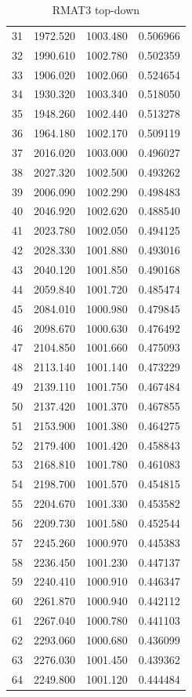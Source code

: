 \documentclass[10pt,twocolumn,letterpaper]{article}
\begin{document}
\begin{table}[h]
\begin{tabular}{@{}c|ccc@{}}
31 & 1972.520 & 1003.480 & 0.506966 \\
32 & 1990.610 & 1002.780 & 0.502359 \\
33 & 1906.020 & 1002.060 & 0.524654 \\
34 & 1930.320 & 1003.340 & 0.518050 \\
35 & 1948.260 & 1002.440 & 0.513278 \\
36 & 1964.180 & 1002.170 & 0.509119 \\
37 & 2016.020 & 1003.000 & 0.496027 \\
38 & 2027.320 & 1002.500 & 0.493262 \\
39 & 2006.090 & 1002.290 & 0.498483 \\
40 & 2046.920 & 1002.620 & 0.488540 \\
41 & 2023.780 & 1002.050 & 0.494125 \\
42 & 2028.330 & 1001.880 & 0.493016 \\
43 & 2040.120 & 1001.850 & 0.490168 \\
44 & 2059.840 & 1001.720 & 0.485474 \\
45 & 2084.010 & 1000.980 & 0.479845 \\
46 & 2098.670 & 1000.630 & 0.476492 \\
47 & 2104.850 & 1001.660 & 0.475093 \\
48 & 2113.140 & 1001.140 & 0.473229 \\
49 & 2139.110 & 1001.750 & 0.467484 \\
50 & 2137.420 & 1001.370 & 0.467855 \\
51 & 2153.900 & 1001.380 & 0.464275 \\
52 & 2179.400 & 1001.420 & 0.458843 \\
53 & 2168.810 & 1001.780 & 0.461083 \\
54 & 2198.700 & 1001.570 & 0.454815 \\
55 & 2204.670 & 1001.330 & 0.453582 \\
56 & 2209.730 & 1001.580 & 0.452544 \\
57 & 2245.260 & 1000.970 & 0.445383 \\
58 & 2236.450 & 1001.230 & 0.447137 \\
59 & 2240.410 & 1000.910 & 0.446347 \\
60 & 2261.870 & 1000.940 & 0.442112 \\
61 & 2267.040 & 1000.780 & 0.441103 \\
62 & 2293.060 & 1000.680 & 0.436099 \\
63 & 2276.030 & 1001.450 & 0.439362 \\
64 & 2249.800 & 1001.120 & 0.444484 \\
\bottomrule
\end{tabular}
\caption{RMAT3 top-down}
\end{table}
\end{document}
